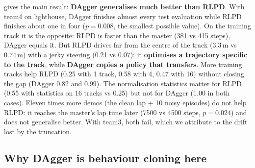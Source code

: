 \documentclass[10pt,a4paper]{article}
\begin{document}
 gives the main result: \textbf{DAgger generalises much better than RLPD}.
With team4 on lighthouse, DAgger finishes almost every test evaluation while RLPD finishes about one in four ($p=0.008$, the smallest possible value).
On the training track it is the opposite: RLPD is faster than the master (381 vs 415 steps), DAgger equals it. But RLPD drives far from the centre of the track (3.3\,m vs 0.74\,m) with a jerky steering (0.21 vs 0.07): it \textbf{optimises a trajectory specific to the track}, while \textbf{DAgger copies a policy that transfers}.
More training tracks help RLPD (0.25 with 1 track, 0.58 with 4, 0.47 with 16) without closing the gap (DAgger 0.82 and 0.99).
The normalisation statistics matter for RLPD (0.55 with statistics on 16 tracks vs 0.25) but not for DAgger (1.00 in both cases).
Eleven times more demos (the clean lap + 10 noisy episodes) do not help RLPD: it reaches the master's lap time later (7500 vs 4500 steps, $p=0.024$) and does not generalise better.
With team3, both fail, which we attribute to the drift lost by the truncation.

\subsection{Why DAgger is behaviour cloning here}

\begin{table}[t]
\centering\small
\setlength{\tabcolsep}{3pt}
\caption{\textbf{DAgger loop on hacienda (test).} Seeds finishing at the BC point (before any iteration) $\to$ at the last point (20k steps), and finished evaluations from 5000 steps on. Without noise the loop never helps; executed-action noise $\sigma$ (labels stay clean) makes it useful again.}
\label{tab:loop}
\end{table}
\end{document}
